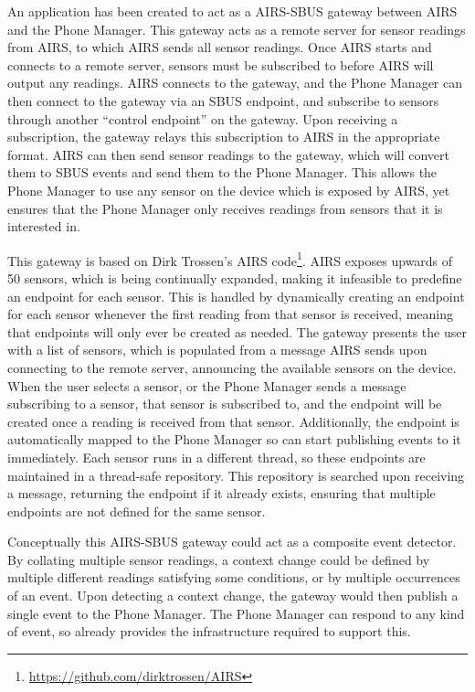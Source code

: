\documentclass[12pt,twoside,notitlepage]{report}
\begin{document}
An application has been created to act as a AIRS-SBUS gateway between AIRS and the Phone Manager. 
This gateway acts as a remote server for sensor readings from AIRS, to which AIRS sends all sensor readings. 
Once AIRS starts and connects to a remote server, sensors must be subscribed to before AIRS will output any readings. 
AIRS connects to the gateway, and the Phone Manager can then connect to the gateway via an SBUS endpoint, and subscribe to sensors through another ``control endpoint'' on the gateway. 
Upon receiving a subscription, the gateway relays this subscription to AIRS in the appropriate format. 
AIRS can then send sensor readings to the gateway, which will convert them to SBUS events and send them to the Phone Manager. 
This allows the Phone Manager to use any sensor on the device which is exposed by AIRS, yet ensures that the Phone Manager only receives readings from sensors that it is interested in. 
 
This gateway is based on Dirk Trossen's AIRS code\footnote{\url{https://github.com/dirktrossen/AIRS}}. 
AIRS exposes upwards of 50 sensors, which is being continually expanded, making it infeasible to predefine an endpoint for each sensor. 
This is handled by dynamically creating an endpoint for each sensor whenever the first reading from that sensor is received, meaning that endpoints will only ever be created as needed. 
The gateway presents the user with a list of sensors, which is populated from a message AIRS sends upon connecting to the remote server, announcing the available sensors on the device. 
When the user selects a sensor, or the Phone Manager sends a message subscribing to a sensor, that sensor is subscribed to, and the endpoint will be created once a reading is received from that sensor. 
Additionally, the endpoint is automatically mapped to the Phone Manager so can start publishing events to it immediately. 
Each sensor runs in a different thread, so these endpoints are maintained in a thread-safe repository. 
This repository is searched upon receiving a message, returning the endpoint if it already exists, ensuring that multiple endpoints are not defined for the same sensor. 

Conceptually this AIRS-SBUS gateway could act as a composite event detector. 
By collating multiple sensor readings, a context change could be defined by multiple different readings satisfying some conditions, or by multiple occurrences of an event.
Upon detecting a context change, the gateway would then publish a single event to the Phone Manager. 
The Phone Manager can respond to any kind of event, so already provides the infrastructure required to support this.
\end{document}
